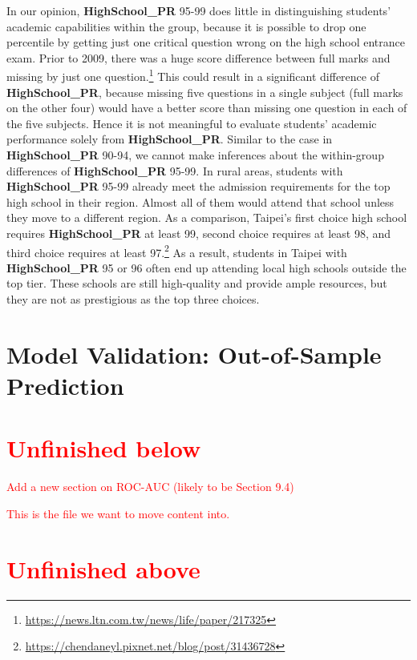 \documentclass[
]{article}
\begin{document}
In our opinion, \textbf{HighSchool\_PR} 95-99 does little in
distinguishing students' academic capabilities within the group, because
it is possible to drop one percentile by getting just one critical
question wrong on the high school entrance exam. Prior to 2009, there
was a huge score difference between full marks and missing by just one
question.\footnote{\url{https://news.ltn.com.tw/news/life/paper/217325}}
This could result in a significant difference of
\textbf{HighSchool\_PR}, because missing five questions in a single
subject (full marks on the other four) would have a better score than
missing one question in each of the five subjects. Hence it is not
meaningful to evaluate students' academic performance solely from
\textbf{HighSchool\_PR}. Similar to the case in \textbf{HighSchool\_PR}
90-94, we cannot make inferences about the within-group differences of
\textbf{HighSchool\_PR} 95-99. In rural areas, students with
\textbf{HighSchool\_PR} 95-99 already meet the admission requirements
for the top high school in their region. Almost all of them would attend
that school unless they move to a different region. As a comparison,
Taipei's first choice high school requires \textbf{HighSchool\_PR} at
least 99, second choice requires at least 98, and third choice requires
at least 97.\footnote{\url{https://chendaneyl.pixnet.net/blog/post/31436728}}
As a result, students in Taipei with \textbf{HighSchool\_PR} 95 or 96
often end up attending local high schools outside the top tier. These
schools are still high-quality and provide ample resources, but they are
not as prestigious as the top three choices.

\hypertarget{out-of-sample}{%
\section{Model Validation: Out-of-Sample
Prediction}\label{out-of-sample}}

\section*{\textcolor{red}{Unfinished below}}

\textcolor{red}{Add a new section on ROC-AUC (likely to be Section 9.4)}

\textcolor{red}{This is the file we want to move content into.}

\section*{\textcolor{red}{Unfinished above}}
\end{document}
